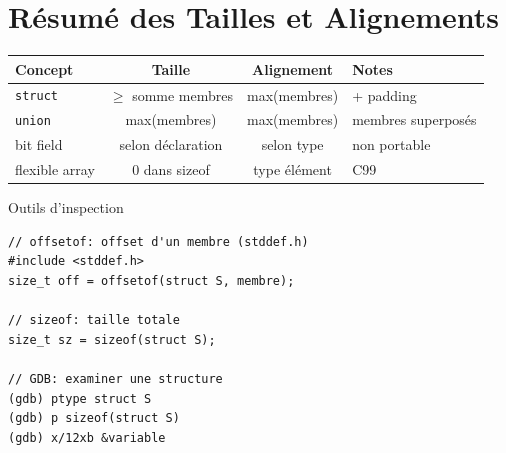 \documentclass[10pt,a4paper]{article}
\begin{document}
\section{Résumé des Tailles et Alignements}

\begin{center}
\begin{tabular}{|l|c|c|l|}
\hline
\textbf{Concept} & \textbf{Taille} & \textbf{Alignement} & \textbf{Notes} \\
\hline
\texttt{struct} & $\geq$ somme membres & max(membres) & + padding \\
\texttt{union} & max(membres) & max(membres) & membres superposés \\
bit field & selon déclaration & selon type & non portable \\
flexible array & 0 dans sizeof & type élément & C99 \\
\hline
\end{tabular}
\end{center}

\begin{infobox}{Outils d'inspection}
\begin{lstlisting}
// offsetof: offset d'un membre (stddef.h)
#include <stddef.h>
size_t off = offsetof(struct S, membre);

// sizeof: taille totale
size_t sz = sizeof(struct S);

// GDB: examiner une structure
(gdb) ptype struct S
(gdb) p sizeof(struct S)
(gdb) x/12xb &variable
\end{lstlisting}
\end{infobox}
\end{document}
